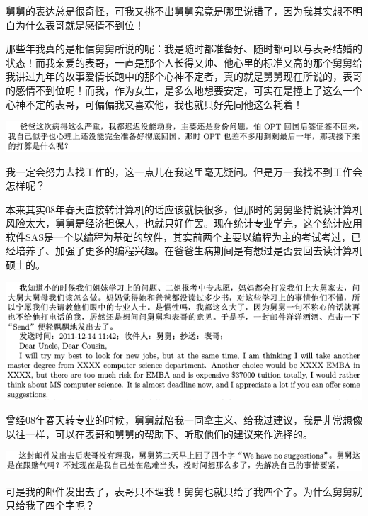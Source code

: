 \documentclass[9pt, b5paper]{article}
\begin{document}
舅舅的表达总是很奇怪，可我又挑不出舅舅究竟是哪里说错了，因为我其实想不明白为什么表哥就是感情不到位！

那些年我真的是相信舅舅所说的呢：我是随时都准备好、随时都可以与表哥结婚的状态！而我亲爱的表哥，一直是那个人长得又帅、他心里的标准又高的那个舅舅给我讲过九年的故事爱情长跑中的那个心神不定者，真的就是舅舅现在所说的，表哥的感情不到位呢！而我，作为女生，是多么地想要安定，可实在是撞上了这么一个心神不定的表哥，可偏偏我又喜欢他，我也就只好先同他这么耗着！

\begin{center}
\includegraphics[width=.9\linewidth]{./pic/backups_plans_20210414_160826.png}
\end{center}

我一定会努力去找工作的，这一点儿在我这里毫无疑问。但是万一我找不到工作会怎样呢？

本来其实08年春天直接转计算机的话应该就快很多，但那时的舅舅坚持说读计算机风险太大，舅舅是经济担保人，也就只好作罢。现在统计专业学完，这个统计应用软件SAS是一个以编程为基础的软件，其实前两个主要以编程为主的考试考过，已经培养了、加强了更多的编程兴趣。在爸爸生病期间是有想过是否要回去读计算机硕士的。 

\begin{center}
\includegraphics[width=.9\linewidth]{./pic/backups_plans_20210414_161113.png}
\end{center}

曾经08年春天转专业的时候，舅舅就陪我一同拿主义、给我过建议，我是非常想像以往一样，可以在表哥和舅舅的帮助下、听取他们的建议来作选择的。

\begin{center}
\includegraphics[width=.9\linewidth]{./pic/backups_plans_20210414_161140.png}
\end{center}

可是我的邮件发出去了，表哥只不理我！舅舅也就只给了我四个字。为什么舅舅就只给我了四个字呢？
\end{document}
